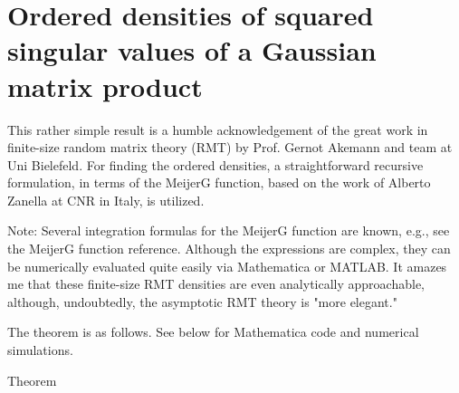 \section{Ordered densities of squared singular values of a Gaussian matrix product}

This rather simple result is a humble acknowledgement of the great work in finite-size random matrix theory (RMT) by Prof. Gernot Akemann and team at Uni Bielefeld. For finding the ordered densities, a straightforward recursive formulation, in terms of the MeijerG function, based on the work of Alberto Zanella at CNR in Italy, is utilized.

Note: Several integration formulas for the MeijerG function are known, e.g., see the MeijerG function reference.
Although the expressions are complex, they can be numerically evaluated quite easily via Mathematica or MATLAB. It amazes me that these finite-size RMT densities are even analytically approachable, although, undoubtedly, the asymptotic RMT theory is "more elegant."

The theorem is as follows. See below for Mathematica code and numerical simulations.

Theorem

